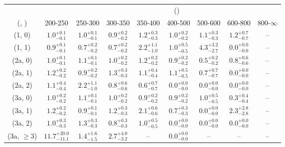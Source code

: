 \begin{table}[h!]
\tiny
\centering
{}
\begin{tabular}
{ccccccccc}
	\hline\hline
&	& \multicolumn{8}{c}{\scalht (\gev)} \\ 
	 (\njet,  \nb) & 200-250 & 250-300 & 300-350 & 350-400 & 400-500 & 500-600 & 600-800 & 800-$\infty$ \\ [0.8ex] 
\hline
	(1, 0) & $1.0^{+ 0.1 }_{- 0.1 }$ & $1.0^{+ 0.1 }_{- 0.1 }$ & $0.9^{+ 0.2 }_{- 0.2 }$ & $1.2^{+ 0.3 }_{- 0.3 }$ & $1.0^{+ 0.2 }_{- 0.2 }$ & $1.1^{+ 0.3 }_{- 0.3 }$ & $1.2^{+ 0.7 }_{- 0.7 }$ & -- \\[0.5ex] 
	(1, 1) & $0.9^{+ 0.1 }_{- 0.1 }$ & $0.7^{+ 0.2 }_{- 0.2 }$ & $0.7^{+ 0.2 }_{- 0.2 }$ & $2.2^{+ 1.1 }_{- 1.0 }$ & $1.0^{+ 0.5 }_{- 0.5 }$ & $4.3^{+ 3.2 }_{- 2.7 }$ & $0.0^{+ 0.0 }_{- 0.0 }$ & -- \\[0.5ex] 
	(2a, 0) & $1.0^{+ 0.1 }_{- 0.1 }$ & $1.1^{+ 0.1 }_{- 0.1 }$ & $1.0^{+ 0.2 }_{- 0.2 }$ & $1.2^{+ 0.2 }_{- 0.2 }$ & $0.9^{+ 0.2 }_{- 0.2 }$ & $0.5^{+ 0.2 }_{- 0.2 }$ & $0.8^{+ 0.6 }_{- 0.6 }$ & -- \\[0.5ex] 
	(2a, 1) & $1.2^{+ 0.2 }_{- 0.2 }$ & $0.9^{+ 0.2 }_{- 0.2 }$ & $1.3^{+ 0.3 }_{- 0.3 }$ & $1.1^{+ 0.4 }_{- 0.4 }$ & $1.1^{+ 0.5 }_{- 0.5 }$ & $0.7^{+ 0.7 }_{- 0.7 }$ & $0.0^{+ 0.0 }_{- 0.0 }$ & -- \\[0.5ex] 
	(2a, 2) & $1.1^{+ 0.4 }_{- 0.4 }$ & $2.2^{+ 1.1 }_{- 1.0 }$ & $0.8^{+ 0.6 }_{- 0.6 }$ & $0.6^{+ 0.7 }_{- 0.7 }$ & $0.0^{+ 0.0 }_{- 0.0 }$ & $0.0^{+ 0.0 }_{- 0.0 }$ & $0.0^{+ 0.0 }_{- 0.0 }$ & -- \\[0.5ex] 
	(3a, 0) & $1.0^{+ 0.2 }_{- 0.2 }$ & $1.1^{+ 0.1 }_{- 0.1 }$ & $1.0^{+ 0.2 }_{- 0.2 }$ & $0.9^{+ 0.2 }_{- 0.2 }$ & $0.9^{+ 0.2 }_{- 0.2 }$ & $1.0^{+ 0.5 }_{- 0.5 }$ & $0.3^{+ 0.4 }_{- 0.4 }$ & -- \\[0.5ex] 
	(3a, 1) & $1.2^{+ 0.2 }_{- 0.2 }$ & $0.9^{+ 0.1 }_{- 0.1 }$ & $1.2^{+ 0.3 }_{- 0.3 }$ & $2.1^{+ 0.6 }_{- 0.6 }$ & $0.7^{+ 0.3 }_{- 0.3 }$ & $0.0^{+ 0.0 }_{- 0.0 }$ & $2.3^{+ 2.8 }_{- 2.8 }$ & -- \\[0.5ex] 
	(3a, 2) & $1.0^{+ 0.3 }_{- 0.3 }$ & $1.3^{+ 0.3 }_{- 0.3 }$ & $0.8^{+ 0.3 }_{- 0.3 }$ & $1.0^{+ 0.5 }_{- 0.5 }$ & $0.0^{+ 0.0 }_{- 0.0 }$ & $0.0^{+ 0.0 }_{- 0.0 }$ & $0.0^{+ 0.0 }_{- 0.0 }$ & -- \\[0.5ex] 
	(3a, $\ge3$) & $11.7^{+ 20.0 }_{- 11.1 }$ & $1.4^{+ 1.6 }_{- 1.5 }$ & $2.7^{+ 4.0 }_{- 3.2 }$ & -- & $0.0^{+ 0.0 }_{- 0.0 }$ & -- & -- & -- \\[0.5ex] 

\end{tabular}
\end{table}
